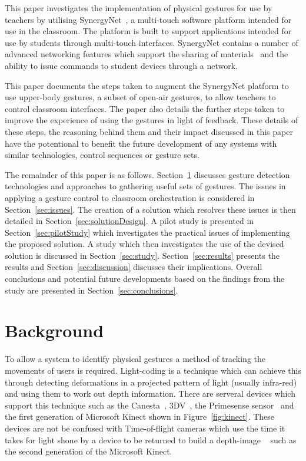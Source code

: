 \documentclass[link]{IWCOMP}
\begin{document}
This paper investigates the implementation of physical gestures for use by teachers by utilising SynergyNet~\cite{HatchA.HigginsSMercier2009}, a multi-touch software platform intended for use in the classroom.
The platform is built to support applications intended for use by students through multi-touch interfaces.
SynergyNet contains a number of advanced networking features which support the sharing of materials~\cite{mcnaughton-et-al:jce2017} and the ability to issue commands to student devices through a network.

This paper documents the steps taken to augment the SynergyNet platform to use upper-body gestures, a subset of open-air gestures, to allow teachers to control classroom interfaces.
The paper also details the further steps taken to improve the experience of using the gestures in light of feedback.
These details of these steps, the reasoning behind them and their impact discussed in this paper have the potentional to benefit the future development of any systems with similar technologies, control sequences or gesture sets.

The remainder of this paper is as follows. 
Section~\ref{sec:background} discusses gesture detection technologies and approaches to gathering useful sets of gestures.
The issues in applying a gesture control to classroom orchestration is considered in Section~\ref{sec:issues}.
The creation of a solution which resolves these issues is then detailed in Section~\ref{sec:solutionDesign}.
A pilot study is presented in Section~\ref{sec:pilotStudy} which investigates the practical issues of implementing the proposed solution.
A study which then investigates the use of the devised solution is discussed in Section~\ref{sec:study}.
Section~\ref{sec:results} presents the results and Section~\ref{sec:discussion} discusses their implications.
Overall conclusions and potential future developments based on the findings from the study are presented in Section~\ref{sec:conclusions}.

\section{Background} 
\label{sec:background}


To allow a system to identify physical gestures a method of tracking the movements of users is required.
Light-coding is a technique which can achieve this through detecting deformations in a projected pattern of light (usually infra-red) and using them to work out depth information.
There are serveral devices which support this technique such as the Canesta~\cite{Yang2007}, 3DV~\cite{Wilson2007a}, the Primesense sensor~\cite{Wilson2010} and the first generation of Microsoft Kinect shown in Figure~\ref{fig:kinect}.
These devices are not be confused with Time-of-flight cameras which use the time it takes for light shone by a device to be returned to build a depth-image ~\cite{Lange2001} such as the second generation of the Microsoft Kinect.
\end{document}
